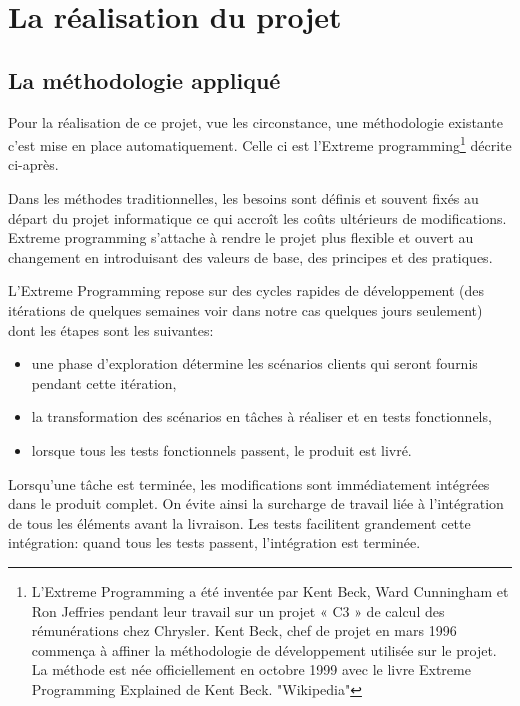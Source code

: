 \section{La réalisation du projet}
    \subsection{La méthodologie appliqué}
Pour la réalisation de ce projet, vue les circonstance, une méthodologie existante c'est mise en place automatiquement. Celle ci est l'Extreme programming\footnote{L'Extreme Programming a été inventée par Kent Beck, Ward Cunningham et Ron Jeffries pendant leur travail sur un projet « C3 » de calcul des rémunérations chez Chrysler. Kent Beck, chef de projet en mars 1996 commença à affiner la méthodologie de développement utilisée sur le projet. La méthode est née officiellement en octobre 1999 avec le livre Extreme Programming Explained de Kent Beck. "Wikipedia"} décrite ci-après.

Dans les méthodes traditionnelles, les besoins sont définis et souvent fixés au départ du projet informatique ce qui accroît les coûts ultérieurs de modifications. Extreme programming s'attache à rendre le projet plus flexible et ouvert au changement en introduisant des valeurs de base, des principes et des pratiques.

L'Extreme Programming repose sur des cycles rapides de développement (des itérations de quelques semaines voir dans notre cas quelques jours seulement) dont les étapes sont les suivantes:
\begin{itemize}
\item une phase d'exploration détermine les scénarios clients qui seront fournis pendant cette itération,
\item la transformation des scénarios en tâches à réaliser et en tests fonctionnels,
\item lorsque tous les tests fonctionnels passent, le produit est livré.
\end{itemize}

Lorsqu'une tâche est terminée, les modifications sont immédiatement intégrées dans le produit complet. On évite ainsi la surcharge de travail liée à l'intégration de tous les éléments avant la livraison. Les tests facilitent grandement cette intégration: quand tous les tests passent, l'intégration est terminée.

